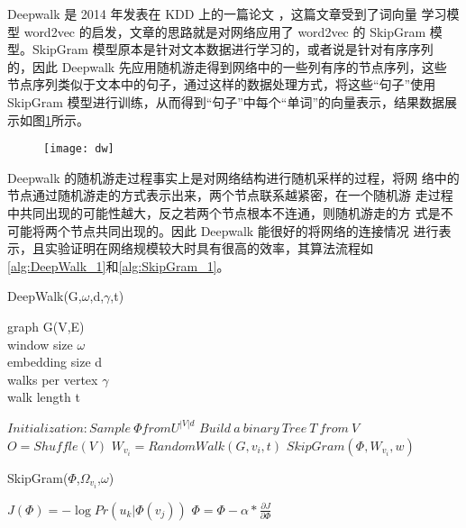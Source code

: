 Deepwalk 是 2014 年发表在 KDD 上的一篇论文 \citep{Perozzi2014DeepWalk}，这篇文章受到了词向量 学习模型 word2vec 的启发，文章的思路就是对网络应用了 word2vec 的 SkipGram 模型。SkipGram 模型原本是针对文本数据进行学习的，或者说是针对有序序列 的，因此 Deepwalk 先应用随机游走得到网络中的一些列有序的节点序列，这些 节点序列类似于文本中的句子，通过这样的数据处理方式，将这些“句子”使用 SkipGram 模型进行训练，从而得到“句子”中每个“单词”的向量表示，结果数据展 示如图\ref{fig:piu_0}所示。
\begin{figure}[!htbp]
    \centering
    \texttt{[image: dw]}
    \label{fig:piu_0}
\end{figure}


Deepwalk 的随机游走过程事实上是对网络结构进行随机采样的过程，将网 络中的节点通过随机游走的方式表示出来，两个节点联系越紧密，在一个随机游 走过程中共同出现的可能性越大，反之若两个节点根本不连通，则随机游走的方 式是不可能将两个节点共同出现的。因此 Deepwalk 能很好的将网络的连接情况 进行表示，且实验证明在网络规模较大时具有很高的效率，其算法流程如\ref{alg:DeepWalk_1}和\ref{alg:SkipGram_1}。

\begin{algorithm}[H]
\renewcommand{\algorithmicrequire}{\textbf{Input:}} 
\renewcommand{\algorithmicensure}{\textbf{Output:}}
    \small
    \caption{DeepWalk(G,$\omega$,d,$\gamma$,t)}
    \label{alg:DeepWalk_1}
    \begin{algorithmic}
    \Require graph G(V,E) \\
    window size $\omega$ \\ 
    embedding size d \\
     walks per vertex $\gamma$ \\ 
     walk length t 
     
      \State $ Initialization: Sample ~\Phi from U^{|V |d}$
      \State $Build~ a~ binary ~Tree~ T ~from~ V $
			\State $O = Shuffle(V ) $
				\State $W_{v_i} = RandomWalk(G,v_i,t)$
				\State $SkipGram(\Phi, W_{v_i} , w)$
			\EndFor
		\EndFor
    \end{algorithmic}
\end{algorithm}

\begin{algorithm}[H]
    \small
    \caption{SkipGram($\Phi$,$\Omega_{v_i}$,$\omega$)}\label{alg:SkipGram_1}
    \begin{algorithmic}[1]
				\State $J(\Phi) = -\log Pr(u_k|\Phi(v_j))$
				\State $\Phi = \Phi - \alpha * \frac{\partial J}{\partial \Phi}$
			\EndFor
		\EndFor
    \end{algorithmic}
\end{algorithm}

